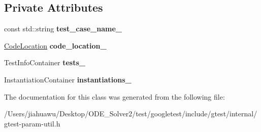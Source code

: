 \subsection*{Private Attributes}
\begin{DoxyCompactItemize}
\item 
\mbox{\label{classtesting_1_1internal_1_1_parameterized_test_case_info_a29b78b287552ba36a896e9352e86440c}} 
const std\+::string {\bfseries test\+\_\+case\+\_\+name\+\_\+}
\item 
\mbox{\label{classtesting_1_1internal_1_1_parameterized_test_case_info_a7eb114d9580001f9cb978684dfa8e0ee}} 
\mbox{\hyperlink{structtesting_1_1internal_1_1_code_location}{Code\+Location}} {\bfseries code\+\_\+location\+\_\+}
\item 
\mbox{\label{classtesting_1_1internal_1_1_parameterized_test_case_info_a561fad516239cf6427df6915ba3182e9}} 
Test\+Info\+Container {\bfseries tests\+\_\+}
\item 
\mbox{\label{classtesting_1_1internal_1_1_parameterized_test_case_info_a2e86fd404a78daa1f1169bf689c4b3f4}} 
Instantiation\+Container {\bfseries instantiations\+\_\+}
\end{DoxyCompactItemize}


The documentation for this class was generated from the following file\+:\begin{DoxyCompactItemize}
\item 
/\+Users/jiahuawu/\+Desktop/\+O\+D\+E\+\_\+\+Solver2/test/googletest/include/gtest/internal/gtest-\/param-\/util.\+h\end{DoxyCompactItemize}
